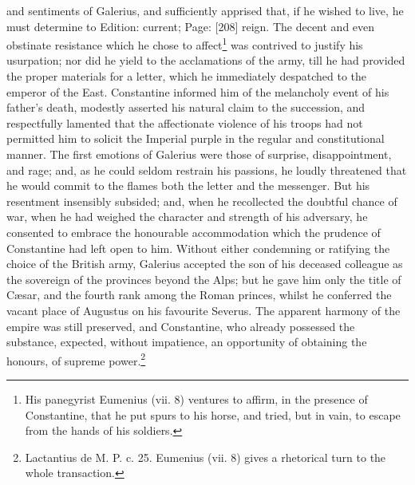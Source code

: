 and sentiments of Galerius, and sufficiently apprised that, if he wished to live, he must determine to Edition: current; Page: [208] reign. The decent and even obstinate resistance which he chose to affect\footnote{His panegyrist Eumenius (vii. 8) ventures to affirm, in the presence of Constantine, that he put spurs to his horse, and tried, but in vain, to escape from the hands of his soldiers.} was contrived to justify his usurpation; nor did he yield to the acclamations of the army, till he had provided the proper materials for a letter, which he immediately despatched to the emperor of the East. Constantine informed him of the melancholy event of his father\texthebrew{}’s death, modestly asserted his natural claim to the succession, and respectfully lamented that the affectionate violence of his troops had not permitted him to solicit the Imperial purple in the regular and constitutional manner. The first emotions of Galerius were those of surprise, disappointment, and rage; and, as he could seldom restrain his passions, he loudly threatened that he would commit to the flames both the letter and the messenger. But his resentment insensibly subsided; and, when he recollected the doubtful chance of war, when he had weighed the character and strength of his adversary, he consented to embrace the honourable accommodation which the prudence of Constantine had left open to him. Without either condemning or ratifying the choice of the British army, Galerius accepted the son of his deceased colleague as the sovereign of the provinces beyond the Alps; but he gave him only the title of Cæsar, and the fourth rank among the Roman princes, whilst he conferred the vacant place of Augustus on his favourite Severus. The apparent harmony of the empire was still preserved, and Constantine, who already possessed the substance, expected, without impatience, an opportunity of obtaining the honours, of supreme power.\footnote{Lactantius de M. P. c. 25. Eumenius (vii. 8) gives a rhetorical turn to the whole transaction.}

